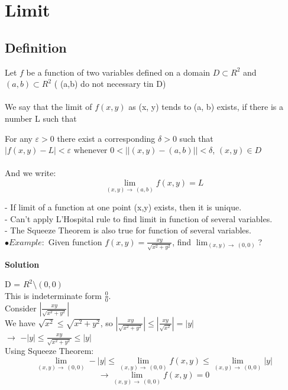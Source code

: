\documentclass[12pt]{article}
\begin{document}
\section{Limit}
\subsection{Definition}
Let $f$ be a function of two variables defined on a domain $D \subset R^2$ and $(a,b) \subset R^2$ ( (a,b) do not necessary tin D)\\
\\
We say that the limit of $f(x, y)$ as (x, y) tends to (a, b) exists, if there is a number L such that
\begin{mybox}
    For any $\varepsilon > 0$ there exist a corresponding $\delta > 0$ such that\\
    $|f(x,y) -L | <\varepsilon$ whenever $0 < ||(x,y) - (a,b) || <\delta$, $(x,y) \in D$ \\
    \\
    And we write: $$\lim_{(x,y) \to\ (a,b)} f(x,y) = L$$
    
\end{mybox} 
- If limit of a function at one point (x,y) exists, then it is unique.\\
- Can't apply L'Hospital rule to find limit in function of several variables.\\  
- The Squeeze Theorem is also true for function of several variables.\\
$\bullet Example:$ Given function $f(x,y) = \frac{xy}{\sqrt{x^2+y^2}}$, find $\lim_{(x,y) \to\ (0,0)}$?\\
\begin{center}
    \textbf{Solution}
\end{center}
D = $R^2 \setminus {(0,0)}$\\
This is indeterminate form $\frac{0}{0}.$\\ 
Consider $|\frac{xy}{\sqrt{x^2+y^2}}|$\\
We have $\sqrt{x^2} \leq \sqrt{x^2 +y^2}$, so $|\frac{xy}{\sqrt{x^2+y^2}}| \leq |\frac{xy}{\sqrt{x^2}}| = |y|$ \\
$\rightarrow$ $-|y| \leq \frac{xy}{\sqrt{x^2+y^2}} \leq |y|$\\
Using Squeeze Theorem: \\
$$\lim_{(x,y) \to \ (0,0)} -|y| \leq \lim_{(x,y) \to \ (0,0)} f(x,y) \leq \lim_{(x,y) \to \ (0,0)} |y|$$ 
$$\rightarrow \lim_{(x,y) \to \ (0,0)} f(x,y) = 0 $$\\ 
\end{document}
